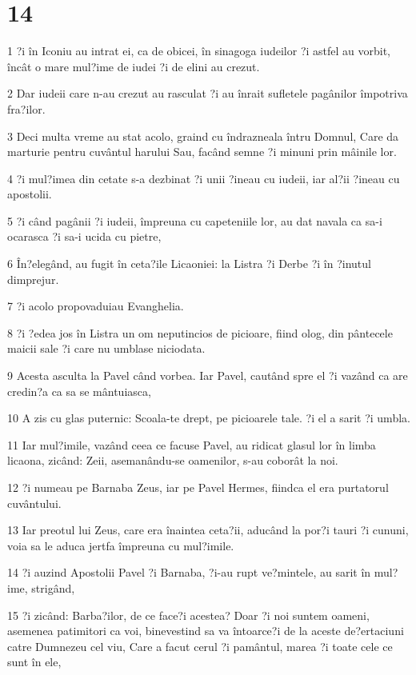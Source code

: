 \chapter{14}

\par 1 ?i în Iconiu au intrat ei, ca de obicei, în sinagoga iudeilor ?i astfel au vorbit, încât o mare mul?ime de iudei ?i de elini au crezut.
\par 2 Dar iudeii care n-au crezut au rasculat ?i au înrait sufletele pagânilor împotriva fra?ilor.
\par 3 Deci multa vreme au stat acolo, graind cu îndrazneala întru Domnul, Care da marturie pentru cuvântul harului Sau, facând semne ?i minuni prin mâinile lor.
\par 4 ?i mul?imea din cetate s-a dezbinat ?i unii ?ineau cu iudeii, iar al?ii ?ineau cu apostolii.
\par 5 ?i când pagânii ?i iudeii, împreuna cu capeteniile lor, au dat navala ca sa-i ocarasca ?i sa-i ucida cu pietre,
\par 6 În?elegând, au fugit în ceta?ile Licaoniei: la Listra ?i Derbe ?i în ?inutul dimprejur.
\par 7 ?i acolo propovaduiau Evanghelia.
\par 8 ?i ?edea jos în Listra un om neputincios de picioare, fiind olog, din pântecele maicii sale ?i care nu umblase niciodata.
\par 9 Acesta asculta la Pavel când vorbea. Iar Pavel, cautând spre el ?i vazând ca are credin?a ca sa se mântuiasca,
\par 10 A zis cu glas puternic: Scoala-te drept, pe picioarele tale. ?i el a sarit ?i umbla.
\par 11 Iar mul?imile, vazând ceea ce facuse Pavel, au ridicat glasul lor în limba licaona, zicând: Zeii, asemanându-se oamenilor, s-au coborât la noi.
\par 12 ?i numeau pe Barnaba Zeus, iar pe Pavel Hermes, fiindca el era purtatorul cuvântului.
\par 13 Iar preotul lui Zeus, care era înaintea ceta?ii, aducând la por?i tauri ?i cununi, voia sa le aduca jertfa împreuna cu mul?imile.
\par 14 ?i auzind Apostolii Pavel ?i Barnaba, ?i-au rupt ve?mintele, au sarit în mul?ime, strigând,
\par 15 ?i zicând: Barba?ilor, de ce face?i acestea? Doar ?i noi suntem oameni, asemenea patimitori ca voi, binevestind sa va întoarce?i de la aceste de?ertaciuni catre Dumnezeu cel viu, Care a facut cerul ?i pamântul, marea ?i toate cele ce sunt în ele,
